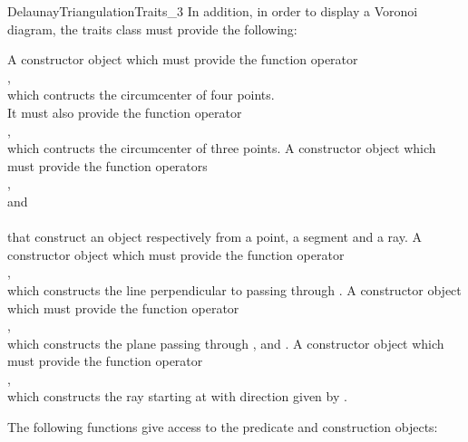 \begin{ccRefConcept}{DelaunayTriangulationTraits_3}
In addition, in order to display a Voronoi diagram, the traits class
must provide the following:

{A constructor object which must provide the function operator\\
,\\
which contructs the circumcenter of four points.
\\
It must also provide the function operator\\
,\\
which contructs the circumcenter of three points.
}
\ccGlue
{}
{A constructor object which must provide the function operators\\
,\\
 and\\
\\
that construct an object respectively from a point, a segment and a ray.}
\ccGlue
{}
{A constructor object which must provide the function operator\\
,\\
which constructs the line perpendicular to  passing through .}
\ccGlue
{}
{A constructor object which must provide the function operator\\
,\\
which constructs the plane passing through ,  and .
}
\ccGlue
{}
{A constructor object which must provide the function operator\\
,\\
which constructs the ray starting at  with direction given by .}


\ccOperations

The following functions give access to the predicate and construction objects:



\end{ccRefConcept}
